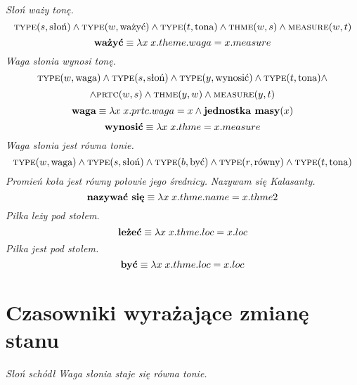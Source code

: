 \documentclass[a4paper,12pt]{article}
\newcommand{\type}[2]{\text{{\sc type}}(#1,\text{#2})}
\newcommand{\thme}[2]{\text{{\sc thme}}(#1,#2)}
\newcommand{\prtc}[2]{\text{{\sc prtc}}(#1,#2)}
\newcommand{\meas}[2]{\text{{\sc measure}}(#1,#2)}
\begin{document}
{\it Słoń waży tonę.}
\[\type{s}{słoń}\wedge\type{w}{ważyć}\wedge\type{t}{tona}\wedge\thme{w}{s}\wedge\meas{w}{t}\]
\[\text{\bf ważyć}\equiv\lambda x\; x.theme.waga=x.measure\]
{\it Waga słonia wynosi tonę.}
\[\type{w}{waga}\wedge\type{s}{słoń}\wedge\type{y}{wynosić}\wedge\type{t}{tona}\wedge\]\[\wedge\prtc{w}{s}\wedge\thme{y}{w}\wedge\meas{y}{t}\]
\[\text{\bf waga}\equiv\lambda x\; x.prtc.waga=x \wedge \text{\bf jednostka masy}(x)\]
\[\text{\bf wynosić}\equiv\lambda x\; x.thme=x.measure\]
{\it Waga słonia jest równa tonie.}
\[\type{w}{waga}\wedge\type{s}{słoń}\wedge\type{b}{być}\wedge\type{r}{równy}\wedge\type{t}{tona}\]
{\it Promień koła jest równy połowie jego średnicy.}
{\it Nazywam się Kalasanty.}
\[\text{\bf nazywać się}\equiv\lambda x\; x.thme.name=x.thme2\]
{\it Piłka leży pod stołem.}
\[\text{\bf leżeć}\equiv\lambda x\; x.thme.loc=x.loc\]
{\it Piłka jest pod stołem.}
\[\text{\bf być}\equiv\lambda x\; x.thme.loc=x.loc\]

\section{Czasowniki wyrażające zmianę stanu}

{\it Słoń schódł}
{\it Waga słonia staje się równa tonie.}
\end{document}
